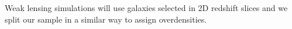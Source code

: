 \documentclass[twocolumn,useAMS,usenatbib]{mn2e}
\newcommand{\rachel}[1]{{\textcolor{red}{#1}}}
\begin{document}

Weak lensing simulations will use galaxies selected in 2D redshift slices and
we split our sample in a similar way to assign overdensities.

\end{document}
